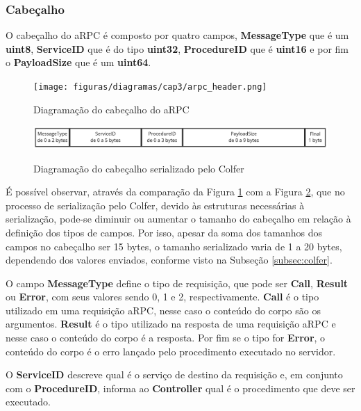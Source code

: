 \subsubsection{Cabeçalho}

O cabeçalho do aRPC é composto por quatro campos, \textbf{MessageType} que é um \textbf{uint8}, \textbf{ServiceID} que é do tipo \textbf{uint32}, \textbf{ProcedureID} que é \textbf{uint16} e por fim o \textbf{PayloadSize} que é um \textbf{uint64}.

\begin{figure}[ht]
    \centering
    \caption{Diagramação do cabeçalho do aRPC}
    \texttt{[image: figuras/diagramas/cap3/arpc\_header.png]} 
    \label{fig:arpc_header}
\end{figure}

\begin{figure}[ht]
    \centering
    \caption{Diagramação do cabeçalho serializado pelo Colfer}
    \includegraphics[width=\textwidth]{figuras/diagramas/cap3/arpc_header_colfer.png} 
    \label{fig:arpc_header_colfer}
\end{figure}

É possível observar, através da comparação da Figura \ref{fig:arpc_header} com a Figura \ref{fig:arpc_header_colfer}, que no processo de serialização pelo Colfer, devido às estruturas necessárias à serialização, pode-se diminuir ou aumentar o tamanho do cabeçalho em relação à definição dos tipos de campos. Por isso, apesar da soma dos tamanhos dos campos no cabeçalho ser 15 bytes, o tamanho serializado varia de 1 a 20 bytes, dependendo dos valores enviados, conforme visto na Subseção \ref{subsec:colfer}.

O campo \textbf{MessageType} define o tipo de requisição, que pode ser \textbf{Call}, \textbf{Result} ou \textbf{Error}, com seus valores sendo 0, 1 e 2, respectivamente. \textbf{Call} é o tipo utilizado em uma requisição aRPC, nesse caso o conteúdo do corpo são os argumentos. \textbf{Result} é o tipo utilizado na resposta de uma requisição aRPC e nesse caso o conteúdo do corpo é a resposta. Por fim se o tipo for \textbf{Error}, o conteúdo do corpo é o erro lançado pelo procedimento executado no servidor.

O \textbf{ServiceID} descreve qual é o serviço de destino da requisição e, em conjunto com o \textbf{ProcedureID}, informa ao \textbf{Controller} qual é o procedimento que deve ser executado.

